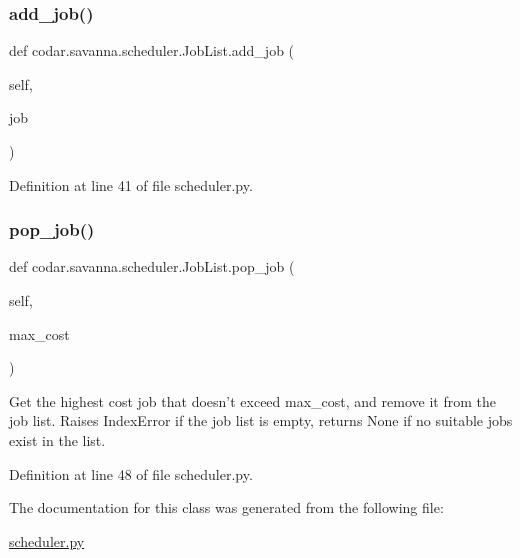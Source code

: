 \subsubsection{\texorpdfstring{add\+\_\+job()}{add\_job()}}
{\footnotesize\ttfamily def codar.\+savanna.\+scheduler.\+Job\+List.\+add\+\_\+job (\begin{DoxyParamCaption}\item[{}]{self,  }\item[{}]{job }\end{DoxyParamCaption})}



Definition at line 41 of file scheduler.\+py.

\mbox{\label{classcodar_1_1savanna_1_1scheduler_1_1_job_list_a5aacbb616928bc7e9078ea08afe8d5ef}} 
\subsubsection{\texorpdfstring{pop\+\_\+job()}{pop\_job()}}
{\footnotesize\ttfamily def codar.\+savanna.\+scheduler.\+Job\+List.\+pop\+\_\+job (\begin{DoxyParamCaption}\item[{}]{self,  }\item[{}]{max\+\_\+cost }\end{DoxyParamCaption})}

\begin{DoxyVerb}Get the highest cost job that doesn't exceed max_cost, and remove
it from the job list. Raises IndexError if the job list is empty,
returns None if no suitable jobs exist in the list.\end{DoxyVerb}
 

Definition at line 48 of file scheduler.\+py.



The documentation for this class was generated from the following file\+:\begin{DoxyCompactItemize}
\item 
\hyperlink{scheduler_8py}{scheduler.\+py}\end{DoxyCompactItemize}
